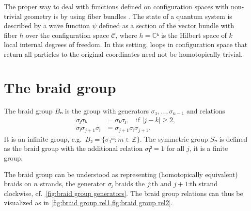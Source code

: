 \begin{remark}\label{rem:fiber bundels}
  The proper way to deal with functions defined on configuration spaces with non-trivial geometry is by using fiber bundles \cite{nakahara}. The state of a quantum system is described by a wave function $ψ$ defined as a section of the vector bundle with fiber $h$ over the configuration space $𝒞$, where $h = ℂᵏ$ is the Hilbert space of $k$ local internal degrees of freedom. In this setting, loops in configuration space that return all particles to the original coordinates need not be homotopically trivial.
\end{remark}





































\section{The braid group}\label{sec:braid group}

The braid group $Bₙ$ is the group with generators $σ₁, …, σ_{n-1}$ and relations
\begin{subequations}
\label{eq:braid relations}
  \begin{align}
    \label{eq:braid relation 1}
    σⱼ σₖ &= σₖ σⱼ, \quad\text{if } |j-k| ≥ 2, \\
    \label{eq:braid relation 2}
    σⱼ σ_{j+1} σⱼ &= σ_{j+1} σⱼ σ_{j+1}.
  \end{align}
\end{subequations}
It is an infinite group, e.g.\ $B₂ = \{σ₁ᵐ: m∈ℤ\}$. The symmetric group $Sₙ$ is defined as the braid group with the additional relation $σⱼ²=1$ for all $j$, it is a finite group.

The braid group can be understood as representing (homotopically equivalent) braids on $n$ strands, the generator $σⱼ$ braids the $j$:th and $j+1$:th strand clockwise, cf.\ \cref{fig:braid group generators}. The braid group relations can thus be visualized as in \cref{fig:braid group rel1,fig:braid group rel2}.

